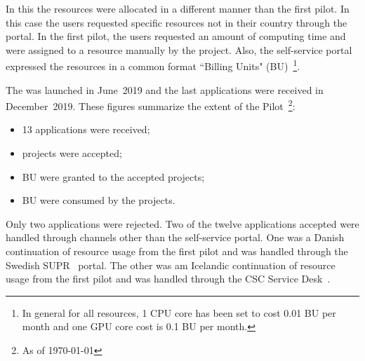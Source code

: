 
In this \pilot the resources were allocated in a different manner than the first pilot.
In this case the users requested specific resources not in their country through the portal. 
In the first pilot, the users requested an amount of computing time and were assigned to a resource manually by the \dell project.
Also, the self-service portal expressed the \einfra resources in a common format ``Billing Units" (BU)~\footnote{In general for all \dell resources, 1 CPU core has been set to cost 0.01 BU per month and one GPU core cost is 0.1 BU per month.}.

The \dell \pilot was launched in June~2019 and the last applications were received in December~2019. 
These figures summarize the extent of the Pilot~\footnote{As of \today}:
\begin{itemize}
\item 13 applications were received;
\item \accepted projects were accepted;
\item \BUreq BU were granted to the accepted projects;
\item \BUcons BU were consumed by the projects.
\end{itemize}
Only two applications were rejected. 
Two of the twelve applications accepted were handled through channels other than the self-service portal.
One was a Danish continuation of resource usage from the first \dell pilot and was handled through the Swedish SUPR~\cite{supr} portal.
The other was am Icelandic continuation of resource usage from the first \dell pilot and was handled through the CSC Service Desk~\cite{csc-service-desk}.


